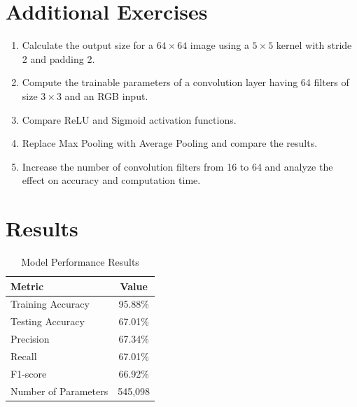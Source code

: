 \documentclass[11pt]{article}
\begin{document}
\section{Additional Exercises}
\begin{enumerate}
    \item Calculate the output size for a $64 \times 64$ image using a $5 \times 5$ kernel with stride 2 and padding 2.
    \item Compute the trainable parameters of a convolution layer having 64 filters of size $3 \times 3$ and an RGB input.
    \item Compare ReLU and Sigmoid activation functions.
    \item Replace Max Pooling with Average Pooling and compare the results.
    \item Increase the number of convolution filters from 16 to 64 and analyze the effect on accuracy and computation time.
\end{enumerate}

\section{Results}

\begin{table}[H]
    \centering
    
    \label{tab:results}
    \begin{tabular}{|l|c|}
        \hline
        \textbf{Metric} & \textbf{Value} \\
        \hline
        Training Accuracy & 95.88\% \\
        \hline
        Testing Accuracy & 67.01\% \\
        \hline
        Precision & 67.34\% \\
        \hline
        Recall & 67.01\% \\
        \hline
        F1-score & 66.92\% \\
        \hline
        Number of Parameters & 545,098 \\
        \hline
    \end{tabular}
    \caption{Model Performance Results}
\end{table}
\end{document}
